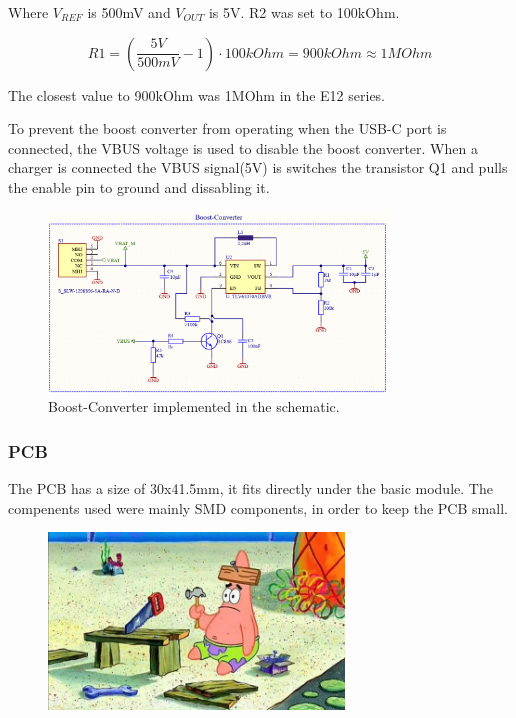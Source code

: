         Where $V_{REF}$ \cite{noauthor_tlv61070apdf_2022} is 500mV and $V_{OUT}$ is 5V. R2 was set to 100kOhm.

        \begin{equation}
            R1 = ( \frac{5V}{500mV} - 1) \cdot 100kOhm = 900kOhm \approx 1MOhm
        \end{equation}

        The closest value to 900kOhm was 1MOhm in the E12 series.
        
        To prevent the boost converter from operating when the USB-C port is connected, the
        VBUS voltage is used to disable the boost converter. When a charger is connected
        the VBUS signal(5V) is switches the transistor Q1 and pulls the enable pin to ground 
        and dissabling it.
        
        \begin{figure}[H]
        \centering
        \includegraphics[width=0.8\textwidth]{assets/HW/Boost-Converter.png}
        \caption{Boost-Converter implemented in the schematic.}
        \end{figure}

    \subsubsection{PCB}

        The PCB has a size of 30x41.5mm, it fits directly under the basic module. 
        The compenents used were mainly SMD components, in order to keep the PCB small. 

        \begin{figure}[H]
            \centering
            \includegraphics[width=0.7\textwidth]{assets/HW/TBD.png}
        \end{figure}



